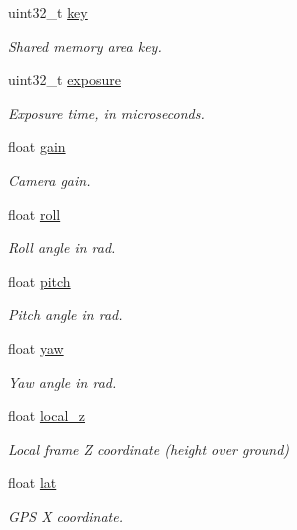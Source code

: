 \begin{DoxyCompactItemize}
uint32\+\_\+t \hyperlink{struct____mavlink__image__available__t_a042a2b1564807927e9b174ceed464535}{key}
\begin{DoxyCompactList}\small\item\em Shared memory area key. \end{DoxyCompactList}\item 
uint32\+\_\+t \hyperlink{struct____mavlink__image__available__t_aee99095f03d198eb05b2ba220d398c1c}{exposure}
\begin{DoxyCompactList}\small\item\em Exposure time, in microseconds. \end{DoxyCompactList}\item 
float \hyperlink{struct____mavlink__image__available__t_a8f7456ee295f1e11f912daabd9658ea5}{gain}
\begin{DoxyCompactList}\small\item\em Camera gain. \end{DoxyCompactList}\item 
float \hyperlink{struct____mavlink__image__available__t_a70a2b5f46ce055f4cfa6c903438a7ca8}{roll}
\begin{DoxyCompactList}\small\item\em Roll angle in rad. \end{DoxyCompactList}\item 
float \hyperlink{struct____mavlink__image__available__t_a5ee810fc74de0b1113b9e9c0419de043}{pitch}
\begin{DoxyCompactList}\small\item\em Pitch angle in rad. \end{DoxyCompactList}\item 
float \hyperlink{struct____mavlink__image__available__t_a804cfe3215d4b9eca8f0640cad24af83}{yaw}
\begin{DoxyCompactList}\small\item\em Yaw angle in rad. \end{DoxyCompactList}\item 
float \hyperlink{struct____mavlink__image__available__t_af5b42ebab80cce99211e957e4cb4aab1}{local\+\_\+z}
\begin{DoxyCompactList}\small\item\em Local frame Z coordinate (height over ground) \end{DoxyCompactList}\item 
float \hyperlink{struct____mavlink__image__available__t_a9325fb7fc6a336498abdd3deefc6ae32}{lat}
\begin{DoxyCompactList}\small\item\em G\+P\+S X coordinate. \end{DoxyCompactList}\item 

\end{DoxyCompactItemize}
